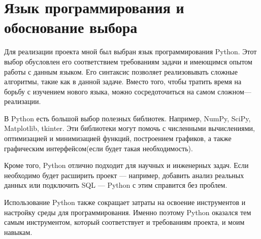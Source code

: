 \documentclass{article}
\begin{document}
\section{Язык программирования и обоснование выбора}
Для реализации проекта мной был выбран язык программирования Python. Этот выбор обусловлен его соответствием требованиям задачи и имеющимся опытом работы с данным языком. Его синтаксис позволяет реализовывать сложные алгоритмы, такие как в данной задаче. Вместо того, чтобы тратить время на борьбу с изучением нового языка, можно сосредоточиться на самом сложном— реализации.  
\par В Python есть большой выбор полезных библиотек. Например, NumPy, SciPy, Matplotlib, tkinter. Эти библиотеки могут помочь с численными вычислениями, оптимизацией и минимизацией функций, построением графиков, а также графическим интерфейсом(если будет такая необходимость). 
\par Кроме того, Python отлично подходит для научных и инженерных задач. Если необходимо будет расширить проект — например, добавить анализ реальных данных или подключить SQL — Python с этим справится без проблем. 
\par Использование Python также сокращает затраты на освоение инструментов и настройку среды для программирования. Именно поэтому Python оказался тем самым инструментом, который соответствует и требованиям проекта, и моим навыкам.
\end{document}
